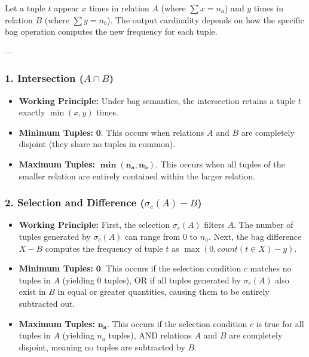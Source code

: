 \documentclass[12pt,a3paper]{article}
\begin{document}
\begin{enumerate}
\begin{tcolorbox}[enhanced,breakable,ansbox,colback=cA!4,colframe=cA,boxrule=0.8pt,arc=5pt,title={\textbf{Answer}},fonttitle=\bfseries\color{white},colbacktitle=cA]
Let a tuple $t$ appear $x$ times in relation $A$ (where $\sum x = n_a$) and $y$ times in relation $B$ (where $\sum y = n_b$). The output cardinality depends on how the specific bag operation computes the new frequency for each tuple.

---

\subsubsection*{1. Intersection ($A \cap B$)}
\begin{itemize}
    \item \textbf{Working Principle:} Under bag semantics, the intersection retains a tuple $t$ exactly $\min(x, y)$ times.
    \item \textbf{Minimum Tuples:} $\mathbf{0}$. This occurs when relations $A$ and $B$ are completely disjoint (they share no tuples in common).
    \item \textbf{Maximum Tuples:} $\mathbf{\min(n_a, n_b)}$. This occurs when all tuples of the smaller relation are entirely contained within the larger relation.
\end{itemize}

\subsubsection*{2. Selection and Difference ($\sigma_c(A) - B$)}
\begin{itemize}
    \item \textbf{Working Principle:} First, the selection $\sigma_c(A)$ filters $A$. The number of tuples generated by $\sigma_c(A)$ can range from $0$ to $n_a$. Next, the bag difference $X - B$ computes the frequency of tuple $t$ as $\max(0, count(t \in X) - y)$.
    \item \textbf{Minimum Tuples:} $\mathbf{0}$. This occurs if the selection condition $c$ matches no tuples in $A$ (yielding 0 tuples), OR if all tuples generated by $\sigma_c(A)$ also exist in $B$ in equal or greater quantities, causing them to be entirely subtracted out.
    \item \textbf{Maximum Tuples:} $\mathbf{n_a}$. This occurs if the selection condition $c$ is true for all tuples in $A$ (yielding $n_a$ tuples), AND relations $A$ and $B$ are completely disjoint, meaning no tuples are subtracted by $B$.
\end{itemize}


\end{tcolorbox}
\end{enumerate}
\end{document}
